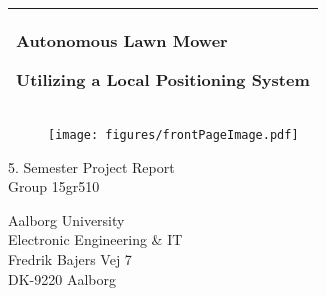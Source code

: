 %
\begin{titlepage}
  \addtolength{\hoffset}{0.5\evensidemargin-0.5\oddsidemargin} %
  \noindent%
  \begin{tabular}{@{}p{\textwidth}@{}}
    \toprule[2pt]
    \midrule
    \vspace{0.2cm}
    \begin{center}
    \Huge{\textbf{
      Autonomous Lawn Mower %
    }}
    \end{center}
    \begin{center}
      \Large{
      Utilizing a Local Positioning System
      }
    \end{center}
    \vspace{0.2cm}\\
    \midrule
    \toprule[2pt]
  \end{tabular}
   \vspace{0.55 cm}
  \begin{figure}[!ht]
\centering
\texttt{[image: figures/frontPageImage.pdf]}
\label{fig:forside}
\end{figure}
  \vspace{-0.35 cm}
  \begin{center}
    {\large
      5. Semester Project Report %
    }\\
    \vspace{0.2cm}
    {\Large
      Group 15gr510%
    }
  \end{center}
  \begin{center}
  Aalborg University\\
  Electronic Engineering \& IT\\
  Fredrik Bajers Vej 7\\
  DK-9220 Aalborg
  \end{center}
\end{titlepage}

\clearpage